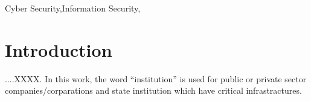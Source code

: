 \documentclass[journal]{IEEEtran}
\begin{document}
\begin{IEEEkeywords}
Cyber Security,Information Security,
\end{IEEEkeywords}

\IEEEpeerreviewmaketitle



\section{Introduction}



....XXXX.
In this work, the word “institution” is used for public or private sector companies/corparations and state institution which have critical infrastractures.





%
%
\end{document}

